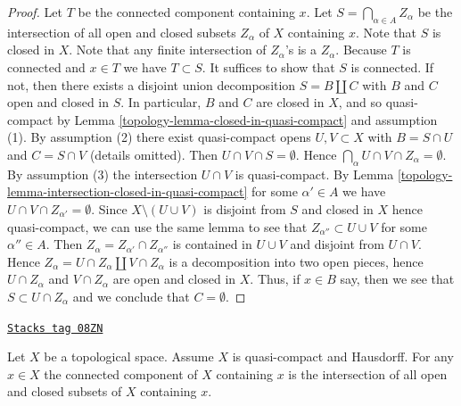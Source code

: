 \begin{proof}

Let $T$ be the connected component containing $x$.
Let $S = \bigcap_{\alpha \in A} Z_\alpha$ be the intersection of all
open and closed subsets $Z_\alpha$ of $X$ containing $x$.
Note that $S$ is closed in $X$.
Note that any finite intersection of $Z_\alpha$'s is a $Z_\alpha$.
Because $T$ is connected and $x \in T$ we have $T \subset S$.
It suffices to show that $S$ is connected.
If not, then there exists a disjoint union decomposition
$S = B \amalg C$ with $B$ and $C$ open and closed in $S$.
In particular, $B$ and $C$ are closed in $X$, and so quasi-compact by
Lemma \ref{topology-lemma-closed-in-quasi-compact} and assumption (1).
By assumption (2) there exist quasi-compact opens
$U, V \subset X$ with $B = S \cap U$ and $C = S \cap V$ (details omitted).
Then $U \cap V \cap S = \emptyset$.
Hence $\bigcap_\alpha U \cap V \cap Z_\alpha = \emptyset$.
By assumption (3) the intersection $U \cap V$ is quasi-compact.
By Lemma \ref{topology-lemma-intersection-closed-in-quasi-compact}
for some $\alpha' \in A$ we have $U \cap V \cap Z_{\alpha'} = \emptyset$.
Since $X \setminus (U \cup V)$ is disjoint from $S$
and closed in $X$ hence quasi-compact, we can use the same lemma
to see that $Z_{\alpha''} \subset U \cup V$ for some $\alpha'' \in A$.
Then $Z_\alpha = Z_{\alpha'} \cap Z_{\alpha''}$ is contained
in $U \cup V$ and disjoint from $U \cap V$.
Hence $Z_\alpha = U \cap Z_\alpha \amalg V \cap Z_\alpha$
is a decomposition into two open pieces,
hence $U \cap Z_\alpha$ and $V \cap Z_\alpha$ are open and closed in $X$.
Thus, if $x \in B$ say, then we see that $S \subset U \cap Z_\alpha$
and we conclude that $C = \emptyset$.
\end{proof}

\begin{lemma}
\label{topology-lemma-connected-component-intersection-compact-Hausdorff}
\href{https://stacks.math.columbia.edu/tag/08ZN}{\texttt{Stacks tag 08ZN}}

Let $X$ be a topological space. Assume $X$ is quasi-compact and Hausdorff.
For any $x \in X$ the connected component of $X$ containing
$x$ is the intersection of all open and closed subsets
of $X$ containing $x$.
\end{lemma}

